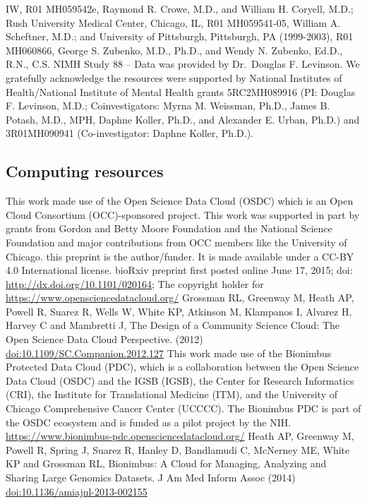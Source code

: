 \documentclass[]{article}
\begin{document}
IW, R01 MH059542e, Raymond R. Crowe, M.D., and William H. Coryell, M.D.;
Rush University Medical Center, Chicago, IL, R01 MH059541-05, William A.
Scheftner, M.D.; and University of Pittsburgh, Pittsburgh, PA
(1999-2003), R01 MH060866, George S. Zubenko, M.D., Ph.D., and Wendy N.
Zubenko, Ed.D., R.N., C.S. NIMH Study 88 -- Data was provided by
Dr.~Douglas F. Levinson. We gratefully acknowledge the resources were
supported by National Institutes of Health/National Institute of Mental
Health grants 5RC2MH089916 (PI: Douglas F. Levinson, M.D.;
Coinvestigators: Myrna M. Weissman, Ph.D., James B. Potash, M.D., MPH,
Daphne Koller, Ph.D., and Alexander E. Urban, Ph.D.) and 3R01MH090941
(Co-investigator: Daphne Koller, Ph.D.).

\subsection{Computing resources}\label{computing-resources}

This work made use of the Open Science Data Cloud (OSDC) which is an
Open Cloud Consortium (OCC)-sponsored project. This work was supported
in part by grants from Gordon and Betty Moore Foundation and the
National Science Foundation and major contributions from OCC members
like the University of Chicago. this preprint is the author/funder. It
is made available under a CC-BY 4.0 International license. bioRxiv
preprint first posted online June 17, 2015; doi:
\url{http://dx.doi.org/10.1101/020164}; The copyright holder for
\url{https://www.opensciencedatacloud.org/} Grossman RL, Greenway M,
Heath AP, Powell R, Suarez R, Wells W, White KP, Atkinson M, Klampanos
I, Alvarez H, Harvey C and Mambretti J, The Design of a Community
Science Cloud: The Open Science Data Cloud Perspective. (2012)
\url{doi:10.1109/SC.Companion.2012.127} This work made use of the
Bionimbus Protected Data Cloud (PDC), which is a collaboration between
the Open Science Data Cloud (OSDC) and the IGSB (IGSB), the Center for
Research Informatics (CRI), the Institute for Translational Medicine
(ITM), and the University of Chicago Comprehensive Cancer Center
(UCCCC). The Bionimbus PDC is part of the OSDC ecosystem and is funded
as a pilot project by the NIH.
\url{https://www.bionimbus-pdc.opensciencedatacloud.org/} Heath AP,
Greenway M, Powell R, Spring J, Suarez R, Hanley D, Bandlamudi C,
McNerney ME, White KP and Grossman RL, Bionimbus: A Cloud for Managing,
Analyzing and Sharing Large Genomics Datasets. J Am Med Inform Assoc
(2014) \url{doi:10.1136/amiajnl-2013-002155}
\end{document}
